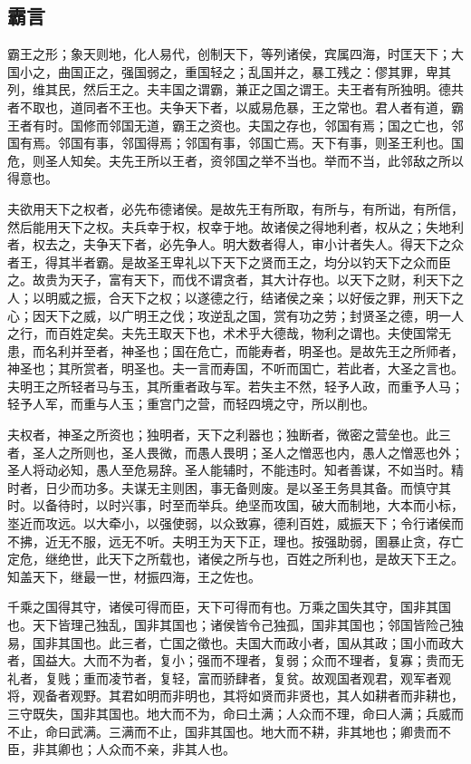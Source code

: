 \documentclass[]{article}
\begin{document}
\hypertarget{header-n359}{%
\subsection{霸言}\label{header-n359}}

霸王之形；象天则地，化人易代，创制天下，等列诸侯，宾属四海，时匡天下；大国小之，曲国正之，强国弱之，重国轻之；乱国并之，暴工残之：僇其罪，卑其列，维其民，然后王之。夫丰国之谓霸，兼正之国之谓王。夫王者有所独明。德共者不取也，道同者不王也。夫争天下者，以威易危暴，王之常也。君人者有道，霸王者有时。国修而邻国无道，霸王之资也。夫国之存也，邻国有焉；国之亡也，邻国有焉。邻国有事，邻国得焉；邻国有事，邻国亡焉。天下有事，则圣王利也。国危，则圣人知矣。夫先王所以王者，资邻国之举不当也。举而不当，此邻敌之所以得意也。

夫欲用天下之权者，必先布德诸侯。是故先王有所取，有所与，有所诎，有所信，然后能用天下之权。夫兵幸于权，权幸于地。故诸侯之得地利者，权从之；失地利者，权去之，夫争天下者，必先争人。明大数者得人，审小计者失人。得天下之众者王，得其半者霸。是故圣王卑礼以下天下之贤而王之，均分以钓天下之众而臣之。故贵为天子，富有天下，而伐不谓贪者，其大计存也。以天下之财，利天下之人；以明威之振，合天下之权；以遂德之行，结诸侯之亲；以好佞之罪，刑天下之心；因天下之威，以广明王之伐；攻逆乱之国，赏有功之劳；封贤圣之德，明一人之行，而百姓定矣。夫先王取天下也，术术乎大德哉，物利之谓也。夫使国常无患，而名利并至者，神圣也；国在危亡，而能寿者，明圣也。是故先王之所师者，神圣也；其所赏者，明圣也。夫一言而寿国，不听而国亡，若此者，大圣之言也。夫明王之所轻者马与玉，其所重者政与军。若失主不然，轻予人政，而重予人马；轻予人军，而重与人玉；重宫门之营，而轻四境之守，所以削也。

夫权者，神圣之所资也；独明者，天下之利器也；独断者，微密之营垒也。此三者，圣人之所则也，圣人畏微，而愚人畏明；圣人之憎恶也内，愚人之憎恶也外；圣人将动必知，愚人至危易辞。圣人能辅时，不能违时。知者善谋，不如当时。精时者，日少而功多。夫谋无主则困，事无备则废。是以圣王务具其备。而慎守其时。以备待时，以时兴事，时至而举兵。绝坚而攻国，破大而制地，大本而小标，埊近而攻远。以大牵小，以强使弱，以众致寡，德利百姓，威振天下；令行诸侯而不拂，近无不服，远无不听。夫明王为天下正，理也。按强助弱，圉暴止贪，存亡定危，继绝世，此天下之所载也，诸侯之所与也，百姓之所利也，是故天下王之。知盖天下，继最一世，材振四海，王之佐也。

千乘之国得其守，诸侯可得而臣，天下可得而有也。万乘之国失其守，国非其国也。天下皆理己独乱，国非其国也；诸侯皆令己独孤，国非其国也；邻国皆险己独易，国非其国也。此三者，亡国之徵也。夫国大而政小者，国从其政；国小而政大者，国益大。大而不为者，复小；强而不理者，复弱；众而不理者，复寡；贵而无礼者，复贱；重而凌节者，复轻，富而骄肆者，复贫。故观国者观君，观军者观将，观备者观野。其君如明而非明也，其将如贤而非贤也，其人如耕者而非耕也，三守既失，国非其国也。地大而不为，命曰土满；人众而不理，命曰人满；兵威而不止，命曰武满。三满而不止，国非其国也。地大而不耕，非其地也；卿贵而不臣，非其卿也；人众而不亲，非其人也。
\end{document}
